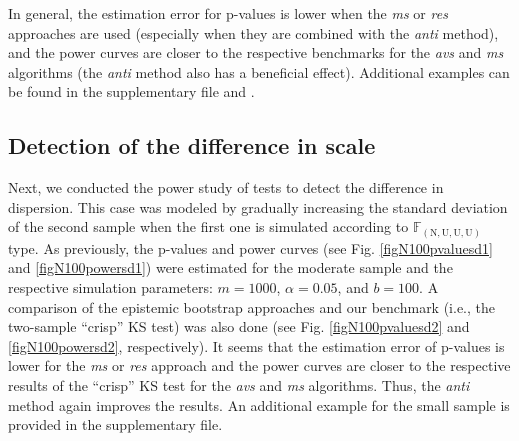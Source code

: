 In general, the estimation error for p-values is lower when the \emph{ms} or \emph{res} approaches are used (especially when they are combined with the \emph{anti} method), and the power curves are closer to the respective benchmarks for the \emph{avs} and \emph{ms} algorithms (the \emph{anti} method also has a beneficial effect).
Additional examples can be found in the supplementary file and \cite{10.1007/978-3-031-08974-9_39}.
\subsection{Detection of the difference in scale}
Next, we conducted the power study of tests to detect the difference in dispersion.
This case was modeled by gradually increasing the standard deviation of the second sample when the first one is simulated according to $\mathbb{F}_{(\mathrm{N,U,U,U})}$ type.
As previously, the p-values and power curves (see Fig. \ref{figN100pvaluesd1} and \ref{figN100powersd1}) were estimated for the moderate sample and the respective simulation parameters: $m=1000$, $\alpha=0.05$, and $b=100$.
A comparison of the epistemic bootstrap approaches and our benchmark (i.e., the two-sample ``crisp'' KS test) was also done (see Fig. \ref{figN100pvaluesd2} and \ref{figN100powersd2}, respectively).
It seems that the estimation error of p-values is lower for the \emph{ms} or \emph{res} approach and the power curves are closer to the respective results of the ``crisp'' KS test for the \emph{avs} and \emph{ms} algorithms. Thus, the \emph{anti} method again improves the results.
An additional example for the small sample is provided in the supplementary file.
